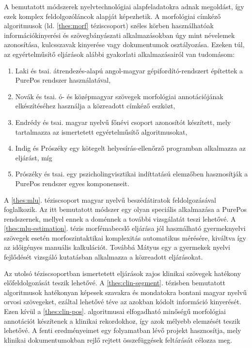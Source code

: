 A bemutatott módszerek nyelvtechnológiai alapfeladatokra adnak megoldást, így ezek komplex feldolgozóláncok alapját képezhetik.
A morfológiai címkéző algoritmusok (ld. \ref{thes:morf} téziscsoport) széles körben használhatóak információkinyerési és szövegbányászati alkalmazásokban úgy mint névelemek azonosítása, kulcsszavak kinyerése vagy dokumentumok osztályozása.
Ezeken túl, az egyértelműsítő eljárások alábbi gyakorlati alkalmazásairól van tudomásom:
\begin{enumerate} %
\item Laki és tsai. átrendezés-alapú angol-magyar gépifordító-rendszert \cite{Laki2013} építettek a PurePos rendszer használatával,
\item Novák és tsai. ó- és középmagyar szövegek morfológiai annotációjának elkészítéséhez használja \cite{Novak2013} a közreadott címkéző eszközt,
\item Endrédy és tsai. \cite{Endredy2014} magyar nyelvű főnévi csoport azonosítót készített, mely tartalmazza az ismertetett egyértelműsítő algoritmusokat,
\item Indig és Prószéky \cite{Indig2013} egy kötegelt helyesírás-ellenőrző programban alkalmazza az eljárást, míg
\item Prószéky és tsai. egy pszicholingvisztikai indíttatású elemzőben hasznosítják \cite{Proszeky2014} a PurePos rendszer egyes komponenseit.
\end{enumerate}

A \ref{thes:mlu}. téziscsoport magyar nyelvű beszédátiratok feldolgozásával foglalkozik. 
Az itt bemutatott módszer egy olyan speciális alkalmazása a PurePos rendszernek, mellyel ennek a doménnek a további vizsgálatát teszi lehetővé.
A \ref{thes:mlu-estimation}. tézis morfémabecslő eljárása jól használható gyermeknyelvi szövegek esetén morfoszintaktikai komplexitás automatikus mérésére, kiváltva így az időigényes manuális kalkulációt.
Továbbá Mátyus \cite{Matyus2014b} egy a gyermekek nyelvi fejlődését vizsgáló kutatásban alkalmazza a közreadott eljárásokat. 

Az utolsó téziscsoportban ismertetett eljárások zajos klinikai szövegek hatékony előfeldolgozását teszik lehetővé.
A \ref{thes:clin-segment}. tézisben bemutatott algoritmusok hatékonyan képesek szavakra és mondatokra bontani magyar nyelvű orvosi szövegeket, ezáltal lehetővé téve az azokban kódolt információ kinyerését. 
Ezen kívül a \ref{thes:clin-pos}. algoritmusai elfogadható minőségű morfológiai annotációt készítenek a klinikai rekordokhoz, így azok mélyebb elemzését teszik lehetővé.
A fenti eredményeimet egy folyamatban lévő projekt \cite{Siklosi2014,Siklosi2014mszny} hasznosítja, mely klinikai dokumentumokban rejlő rejtett összefüggések feltárását célozza  meg.


